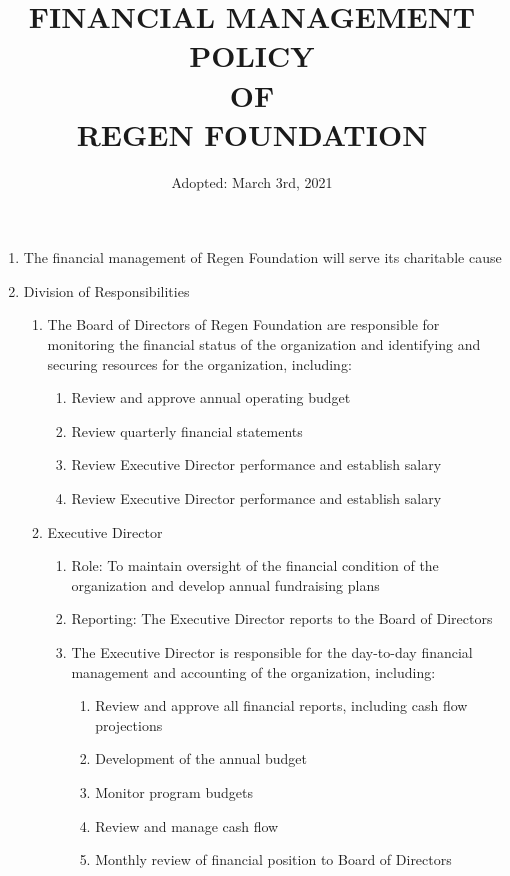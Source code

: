 \documentclass{article}
\begin{document}
\title{FINANCIAL MANAGEMENT POLICY \protect\\ OF \protect\\ REGEN FOUNDATION}
\author{Adopted: March 3rd, 2021}
\date{} 
\maketitle
\begin{enumerate}
\item The financial management of Regen Foundation will serve its charitable cause
\item Division of Responsibilities
\begin{enumerate}
\item The Board of Directors of Regen Foundation are responsible for monitoring the financial status of the organization and identifying and securing resources for the organization, including:
\begin{enumerate}
\item Review and approve annual operating budget
\item Review quarterly financial statements
\item Review Executive Director performance and establish salary
\item Review Executive Director performance and establish salary
\end{enumerate}
\item Executive Director
\begin{enumerate}
\item Role: To maintain oversight of the financial condition of the organization and develop annual fundraising plans
\item Reporting: The Executive Director reports to the Board of Directors
\item The Executive Director is responsible for the day-to-day financial management and accounting of the organization, including:
\begin{enumerate}
\item Review and approve all financial reports, including cash flow projections
\item Development of the annual budget
\item Monitor program budgets
\item Review and manage cash flow
\item Monthly review of financial position to Board of Directors
\end{enumerate}
\end{enumerate}

\end{enumerate}
\end{enumerate}
\end{document}
